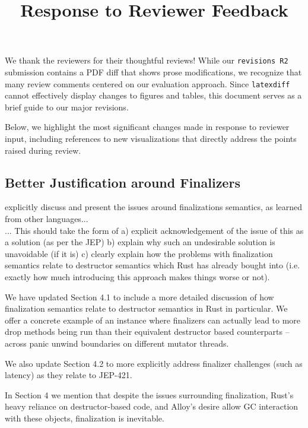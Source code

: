 \documentclass[12pt,a4paper,preprint]{article}
\begin{document}
\date{}  %
\title{Response to Reviewer Feedback}
\maketitle

We thank the reviewers for their thoughtful reviews! While our
\texttt{revisions R2} submission contains a PDF diff that shows prose
modifications, we recognize that many review comments centered on our
evaluation approach. Since \texttt{latexdiff} cannot effectively display
changes to figures and tables, this document serves as a brief guide to our
major revisions.

Below, we highlight the most significant changes made in response to reviewer
input, including references to new visualizations that directly address the
points raised during review.

\subsection*{Better Justification around Finalizers}

\begin{blockquote} explicitly discuss and present the issues around
  finalizations semantics, as learned from other languages...\\

... This should take the form of a) explicit acknowledgement of the issue of
this as a solution (as per the JEP) b) explain why such an undesirable solution
is unavoidable (if it is) c) clearly explain how the problems with finalization
semantics relate to destructor semantics which Rust has already bought into
(i.e. exactly how much introducing this approach makes things worse or not).
\end{blockquote}

We have updated Section 4.1 to include a more detailed discussion of how
finalization semantics relate to destructor semantics in Rust in particular. We
offer a concrete example of an instance where finalizers can actually lead to
more drop methods being run than their equivalent destructor based counterparts
-- across panic unwind boundaries on different mutator threads.

We also update Section 4.2 to more explicitly address finalizer challenges
(such as latency) as they relate to JEP-421.

In Section 4 we mention that despite the issues surrounding finalization,
Rust's heavy reliance on destructor-based code, and Alloy's desire allow GC
interaction with these objects, finalization is inevitable.
\end{document}
